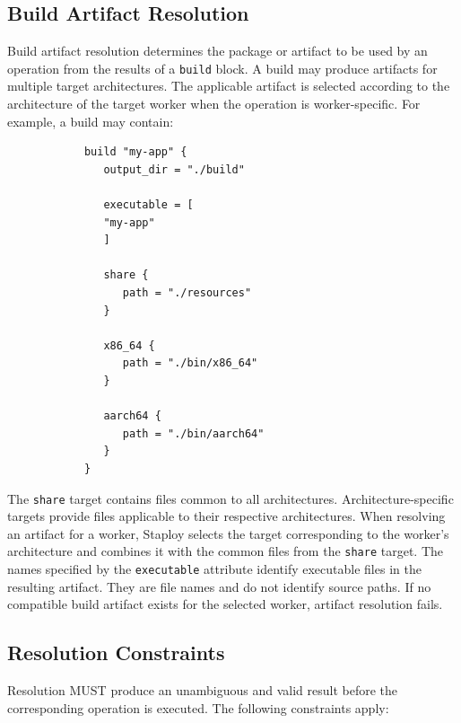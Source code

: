 \documentclass[11pt,a4paper]{article}
\begin{document}
    \subsection{Build Artifact Resolution}\label{subsec:build-artifact-resolution}

    Build artifact resolution determines the package or artifact to be used by an operation from the results of a \texttt{build} block.
    A build may produce artifacts for multiple target architectures.
    The applicable artifact is selected according to the architecture of the target worker when the operation is worker-specific.
    For example, a build may contain:

    \begin{center}
        \begin{verbatim}
            build "my-app" {
               output_dir = "./build"

               executable = [
               "my-app"
               ]

               share {
                  path = "./resources"
               }

               x86_64 {
                  path = "./bin/x86_64"
               }

               aarch64 {
                  path = "./bin/aarch64"
               }
            }
        \end{verbatim}
    \end{center}

    The \texttt{share} target contains files common to all architectures.
    Architecture-specific targets provide files applicable to their respective architectures.
    When resolving an artifact for a worker, Staploy selects the target corresponding to the worker's architecture and combines it with the common files from the \texttt{share} target.
    The names specified by the \texttt{executable} attribute identify executable files in the resulting artifact.
    They are file names and do not identify source paths.
    If no compatible build artifact exists for the selected worker, artifact resolution fails.

    \subsection{Resolution Constraints}\label{subsec:resolution-constraints}

    Resolution MUST produce an unambiguous and valid result before the corresponding operation is executed.
    The following constraints apply:
\end{document}
